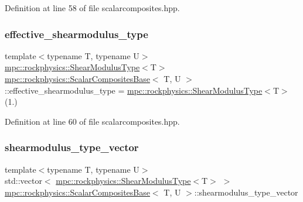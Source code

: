 Definition at line 58 of file scalarcomposites.\+hpp.

\mbox{\label{classmpc_1_1rockphysics_1_1_scalar_composites_base_a3d48702bd7ed14bd922f3e3991111d1b}} 
\subsubsection{\texorpdfstring{effective\+\_\+shearmodulus\+\_\+type}{effective\_shearmodulus\_type}}
{\footnotesize\ttfamily template$<$typename T, typename U$>$ \\
\mbox{\hyperlink{structmpc_1_1rockphysics_1_1_shear_modulus_type}{mpc\+::rockphysics\+::\+Shear\+Modulus\+Type}}$<$T$>$ \mbox{\hyperlink{classmpc_1_1rockphysics_1_1_scalar_composites_base}{mpc\+::rockphysics\+::\+Scalar\+Composites\+Base}}$<$ T, U $>$\+::effective\+\_\+shearmodulus\+\_\+type = \mbox{\hyperlink{structmpc_1_1rockphysics_1_1_shear_modulus_type}{mpc\+::rockphysics\+::\+Shear\+Modulus\+Type}}$<$T$>$(1.)\hspace{0.3cm}{\ttfamily [protected]}}



Definition at line 60 of file scalarcomposites.\+hpp.

\mbox{\label{classmpc_1_1rockphysics_1_1_scalar_composites_base_af6363e3a8cee280c18dbea704d70cf6a}} 
\subsubsection{\texorpdfstring{shearmodulus\+\_\+type\+\_\+vector}{shearmodulus\_type\_vector}}
{\footnotesize\ttfamily template$<$typename T, typename U$>$ \\
std\+::vector$<$ \mbox{\hyperlink{structmpc_1_1rockphysics_1_1_shear_modulus_type}{mpc\+::rockphysics\+::\+Shear\+Modulus\+Type}}$<$T$>$ $>$ \mbox{\hyperlink{classmpc_1_1rockphysics_1_1_scalar_composites_base}{mpc\+::rockphysics\+::\+Scalar\+Composites\+Base}}$<$ T, U $>$\+::shearmodulus\+\_\+type\+\_\+vector\hspace{0.3cm}{\ttfamily [protected]}}



